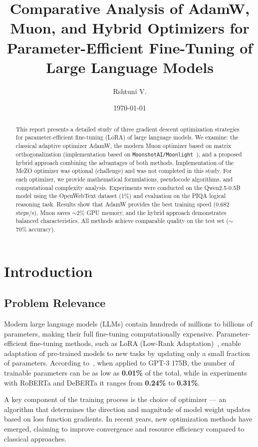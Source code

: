 \documentclass[a4paper,12pt]{article}
\title{Comparative Analysis of AdamW, Muon, and Hybrid Optimizers for Parameter-Efficient Fine-Tuning of Large Language Models}
\author{Rshtuni V.}
\date{\today}
\begin{document}
\maketitle

\begin{abstract}
This report presents a detailed study of three gradient descent optimization strategies for parameter-efficient fine-tuning (LoRA) of large language models. We examine: the classical adaptive optimizer AdamW, the modern Muon optimizer based on matrix orthogonalization (implementation based on \texttt{MoonshotAI/Moonlight}~\cite{moonshot2024muon}), and a proposed hybrid approach combining the advantages of both methods. Implementation of the MeZO optimizer was optional (challenge) and was not completed in this study. For each optimizer, we provide mathematical formulations, pseudocode algorithms, and computational complexity analysis. Experiments were conducted on the Qwen2.5-0.5B model using the OpenWebText dataset (1\%) and evaluation on the PIQA logical reasoning task. Results show that AdamW provides the best training speed (0.682 steps/s), Muon saves $\sim$2\% GPU memory, and the hybrid approach demonstrates balanced characteristics. All methods achieve comparable quality on the test set ($\sim$70\% accuracy).
\end{abstract}
\newpage

\tableofcontents
\newpage

\section{Introduction}
\label{sec:intro}

\subsection{Problem Relevance}

Modern large language models (LLMs) contain hundreds of millions to billions of parameters, making their full fine-tuning computationally expensive. Parameter-efficient fine-tuning methods, such as LoRA (Low-Rank Adaptation)~\cite{hu2021lora}, enable adaptation of pre-trained models to new tasks by updating only a small fraction of parameters. According to~\cite{hu2021lora}, when applied to GPT-3 175B, the number of trainable parameters can be as low as \textbf{0.01\%} of the total, while in experiments with RoBERTa and DeBERTa it ranges from \textbf{0.24\%} to \textbf{0.31\%}.

A key component of the training process is the choice of optimizer --- an algorithm that determines the direction and magnitude of model weight updates based on loss function gradients. In recent years, new optimization methods have emerged, claiming to improve convergence and resource efficiency compared to classical approaches.
\end{document}
